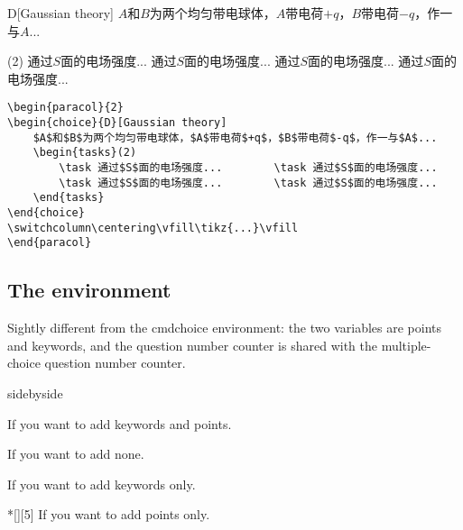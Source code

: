 \begin{paracol}{2}
    \begin{choice}{D}[Gaussian theory]
        $A$和$B$为两个均匀带电球体，$A$带电荷$+q$，$B$带电荷$-q$，作一与$A$...
        \begin{tasks}(2)
            \task 通过$S$面的电场强度...        \task 通过$S$面的电场强度...
            \task 通过$S$面的电场强度...        \task 通过$S$面的电场强度...
        \end{tasks}
    \end{choice}
    \switchcolumn
    \centering\vfill
    \vfill
\end{paracol}
\begin{tcolorbox}
\begin{verbatim}
\begin{paracol}{2}
\begin{choice}{D}[Gaussian theory]
    $A$和$B$为两个均匀带电球体，$A$带电荷$+q$，$B$带电荷$-q$，作一与$A$...
    \begin{tasks}(2)
        \task 通过$S$面的电场强度...        \task 通过$S$面的电场强度...
        \task 通过$S$面的电场强度...        \task 通过$S$面的电场强度...
    \end{tasks}
\end{choice}
\switchcolumn\centering\vfill\tikz{...}\vfill
\end{paracol}
\end{verbatim}
\end{tcolorbox}

\subsection{The  environment}
Sightly different from the cmd{choice} environment: the two variables are points and keywords, and the question number counter is shared with the multiple-choice question number counter.
\begin{tcblisting}{sidebyside}
    \begin{problem}[Keywords][5]
        If you want to add keywords and points.
    \end{problem}
    \begin{problem}
        If you want to add none.
    \end{problem}
    \begin{problem}[Keywords]
        If you want to add keywords only.
    \end{problem}
    \begin{problem}*[][5]
        If you want to add points only.
    \end{problem}
\end{tcblisting}

